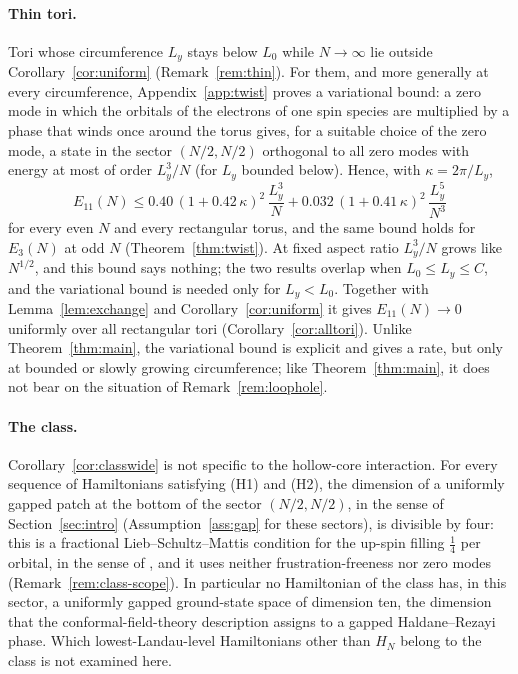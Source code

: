 \paragraph{Thin tori.}
Tori whose circumference $L_y$ stays below $L_0$ while $N\to\infty$ lie outside Corollary~\ref{cor:uniform}
(Remark~\ref{rem:thin}). For them, and more generally at every circumference, Appendix~\ref{app:twist} proves a
variational bound: a zero mode in which the orbitals of the electrons of one spin species are multiplied by a phase that
winds once around the torus gives, for a suitable choice of the zero mode, a state in the sector $(N/2,N/2)$ orthogonal
to all zero modes with energy at most of order $L_y^3/N$ (for $L_y$ bounded below). Hence, with $\kappa=2\pi/L_y$,
\[
E_{11}(N)\le0.40\,(1+0.42\,\kappa)^2\,\frac{L_y^3}N+0.032\,(1+0.41\,\kappa)^2\,\frac{L_y^5}{N^3}
\]
for every even $N$ and every rectangular torus, and the same bound holds for $E_3(N)$ at odd $N$
(Theorem~\ref{thm:twist}). At fixed aspect ratio $L_y^3/N$ grows like $N^{1/2}$, and this bound says nothing; the two
results overlap when $L_0\le L_y\le C$, and the variational bound is needed only for $L_y<L_0$. Together with
Lemma~\ref{lem:exchange} and Corollary~\ref{cor:uniform} it gives $E_{11}(N)\to0$ uniformly over all rectangular tori
(Corollary~\ref{cor:alltori}). Unlike Theorem~\ref{thm:main}, the variational bound is explicit and gives a rate, but only
at bounded or slowly growing circumference; like Theorem~\ref{thm:main}, it does not bear on the situation of
Remark~\ref{rem:loophole}.

\paragraph{The class.}
Corollary~\ref{cor:classwide} is not specific to the hollow-core interaction. For every sequence of Hamiltonians
satisfying (H1) and (H2), the dimension of a uniformly gapped patch at the bottom of the sector $(N/2,N/2)$, in the
sense of Section~\ref{sec:intro} (Assumption~\ref{ass:gap} for these sectors), is divisible by four: this is a fractional Lieb--Schultz--Mattis condition for the up-spin filling $\frac14$ per orbital, in
the sense of \cite[Corollary~5.2]{BBDF21}, and it uses neither frustration-freeness nor zero modes
(Remark~\ref{rem:class-scope}). In particular no Hamiltonian of the class has, in this sector, a uniformly gapped
ground-state space of dimension ten, the dimension that the conformal-field-theory description assigns to a gapped
Haldane--Rezayi phase. Which lowest-Landau-level Hamiltonians other than $H_N$ belong to the class is not examined here.

